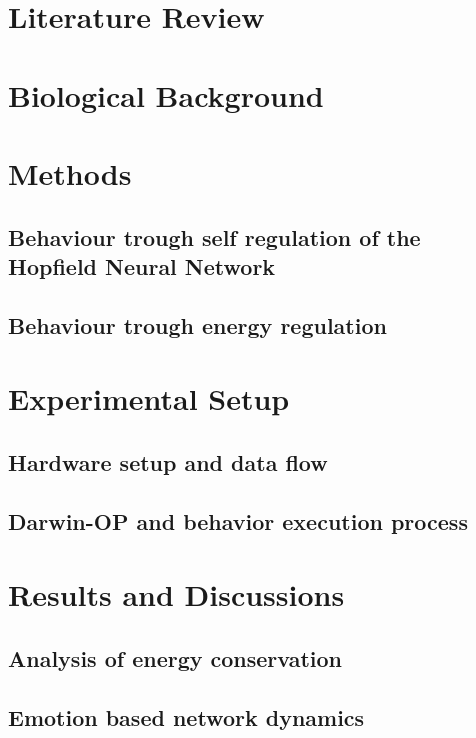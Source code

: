 \documentclass[a4,12pt]{ozu-thesis}
\begin{document}
\section{Literature Review}


\section{Biological Background}


\section{Methods}

\subsection{Behaviour trough self regulation of the Hopfield Neural Network}

\subsection{Behaviour trough energy regulation}


\section{Experimental Setup}

\subsection{Hardware setup and data flow}

\subsection{Darwin-OP and behavior execution process}


\section{Results and Discussions}

\subsection{Analysis of energy conservation}

\subsection{Emotion based network dynamics}

\end{document}
